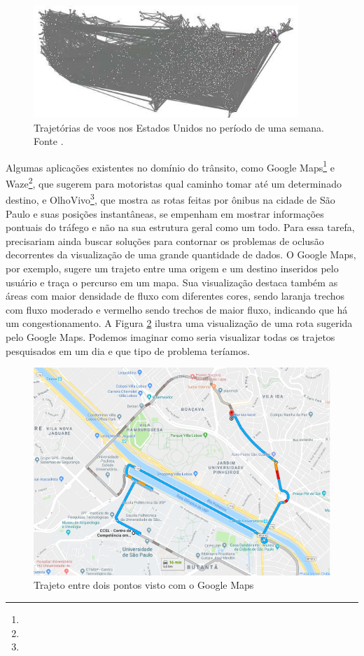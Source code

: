 \begin{figure}[!htb]
  \centering
  \includegraphics[width=100mm]{../figuras/cluttered-map.png}
  \caption[Trajetórias de voos nos Estados Unidos]{Trajetórias de voos nos Estados Unidos no período de uma semana. Fonte \citet{Zhou2013}.}
  \label{fig:exemplo-oclusao}
\end{figure}

  Algumas aplicações existentes no domínio do trânsito, como Google
Maps\footnote{} e
Waze\footnote{}, que sugerem para motoristas qual
caminho tomar até um determinado destino, e
OlhoVivo\footnote{}, que  mostra as rotas feitas
por ônibus na cidade de São Paulo e suas posições instantâneas, se empenham em
mostrar informações pontuais do tráfego e não na sua estrutura geral como um
todo. Para essa tarefa, precisariam ainda buscar soluções para contornar os
problemas de oclusão decorrentes da visualização de uma grande quantidade de
dados. O Google Maps, por exemplo, sugere um trajeto entre uma origem e um
destino inseridos pelo usuário e traça o percurso em um mapa. Sua visualização
destaca também as áreas com maior densidade de fluxo com diferentes cores,
sendo laranja trechos com fluxo moderado e vermelho sendo trechos de maior
fluxo, indicando que há um congestionamento. A Figura \ref{fig:gmaps} ilustra
uma visualização de uma rota sugerida pelo Google Maps. Podemos imaginar como
seria visualizar todas os trajetos pesquisados em um dia e que tipo de problema
teríamos.

\begin{figure}[!htb]
  \centering
  \includegraphics[width=\textwidth]{../figuras/maps.pdf}
  \caption{Trajeto entre dois pontos visto com o Google Maps \label{fig:gmaps}}
\end{figure}

